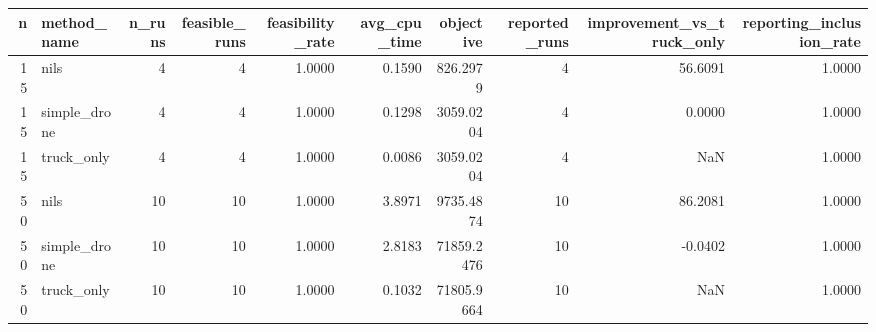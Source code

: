 \begin{tabular}{rlrrrrrrrr}
\toprule
n & method_name & n_runs & feasible_runs & feasibility_rate & avg_cpu_time & objective & reported_runs & improvement_vs_truck_only & reporting_inclusion_rate \\
\midrule
15 & nils & 4 & 4 & 1.0000 & 0.1590 & 826.2979 & 4 & 56.6091 & 1.0000 \\
15 & simple_drone & 4 & 4 & 1.0000 & 0.1298 & 3059.0204 & 4 & 0.0000 & 1.0000 \\
15 & truck_only & 4 & 4 & 1.0000 & 0.0086 & 3059.0204 & 4 & NaN & 1.0000 \\
50 & nils & 10 & 10 & 1.0000 & 3.8971 & 9735.4874 & 10 & 86.2081 & 1.0000 \\
50 & simple_drone & 10 & 10 & 1.0000 & 2.8183 & 71859.2476 & 10 & -0.0402 & 1.0000 \\
50 & truck_only & 10 & 10 & 1.0000 & 0.1032 & 71805.9664 & 10 & NaN & 1.0000 \\
\bottomrule
\end{tabular}
